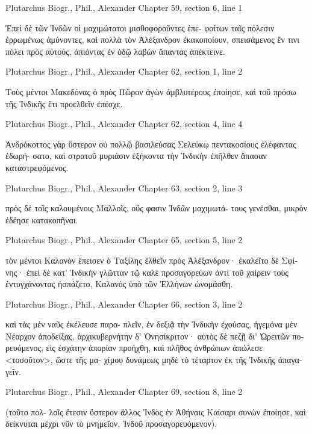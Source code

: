 \documentclass[12pt,letterpaper,twoside,final]{memoir}
\begin{document}
\begin{greek}
Plutarchus Biogr., Phil., Alexander 
Chapter 59, section 6, line 1

Ἐπεὶ δὲ τῶν Ἰνδῶν οἱ μαχιμώτατοι μισθοφοροῦντες ἐπε-
φοίτων ταῖς πόλεσιν ἐρρωμένως ἀμύνοντες, καὶ πολλὰ τὸν 
Ἀλέξανδρον ἐκακοποίουν, σπεισάμενος ἔν τινι πόλει πρὸς 
αὐτούς, ἀπιόντας ἐν ὁδῷ λαβὼν ἅπαντας ἀπέκτεινε. 



Plutarchus Biogr., Phil., Alexander 
Chapter 62, section 1, line 2

Τοὺς μέντοι Μακεδόνας ὁ πρὸς Πῶρον ἀγὼν 
ἀμβλυτέρους ἐποίησε, καὶ τοῦ πρόσω τῆς Ἰνδικῆς ἔτι 
προελθεῖν ἐπέσχε. 



Plutarchus Biogr., Phil., Alexander 
Chapter 62, section 4, line 4

                   Ἀνδρόκοττος γὰρ ὕστερον οὐ πολλῷ 
βασιλεύσας Σελεύκῳ πεντακοσίους ἐλέφαντας ἐδωρή-
σατο, καὶ στρατοῦ μυριάσιν ἑξήκοντα τὴν Ἰνδικὴν ἐπῆλθεν 
ἅπασαν καταστρεφόμενος. 



Plutarchus Biogr., Phil., Alexander 
Chapter 63, section 2, line 3

                                                    πρὸς δὲ 
τοῖς καλουμένοις Μαλλοῖς, οὕς φασιν Ἰνδῶν μαχιμωτά-
τους γενέσθαι, μικρὸν ἐδέησε κατακοπῆναι. 



Plutarchus Biogr., Phil., Alexander 
Chapter 65, section 5, line 2

          τὸν μέντοι Καλανὸν ἔπεισεν ὁ Ταξίλης ἐλθεῖν πρὸς 
Ἀλέξανδρον· ἐκαλεῖτο δὲ Σφίνης· ἐπεὶ δὲ κατ' Ἰνδικὴν 
γλῶτταν τῷ καλὲ προσαγορεύων ἀντὶ τοῦ χαίρειν τοὺς 
ἐντυγχάνοντας ἠσπάζετο, Καλανὸς ὑπὸ τῶν Ἑλλήνων 
ὠνομάσθη. 



Plutarchus Biogr., Phil., Alexander 
Chapter 66, section 3, line 2

                         καὶ τὰς μὲν ναῦς ἐκέλευσε παρα-
πλεῖν, ἐν δεξιᾷ τὴν Ἰνδικὴν ἐχούσας, ἡγεμόνα μὲν Νέαρχον 
ἀποδείξας, ἀρχικυβερνήτην δ' Ὀνησίκριτον· αὐτὸς δὲ πεζῇ 
δι' Ὠρειτῶν πορευόμενος, εἰς ἐσχάτην ἀπορίαν προήχθη, 
καὶ πλῆθος ἀνθρώπων ἀπώλεσε <τοσοῦτον>, ὥστε τῆς μα-
χίμου δυνάμεως μηδὲ τὸ τέταρτον ἐκ τῆς Ἰνδικῆς ἀπαγα-
γεῖν. 



Plutarchus Biogr., Phil., Alexander 
Chapter 69, section 8, line 2

                                                     (τοῦτο πολ-
λοῖς ἔτεσιν ὕστερον ἄλλος Ἰνδὸς ἐν Ἀθήναις Καίσαρι 
συνὼν ἐποίησε, καὶ δείκνυται μέχρι νῦν τὸ μνημεῖον, 
Ἰνδοῦ προσαγορευόμενον). 




\end{greek}
\end{document}
